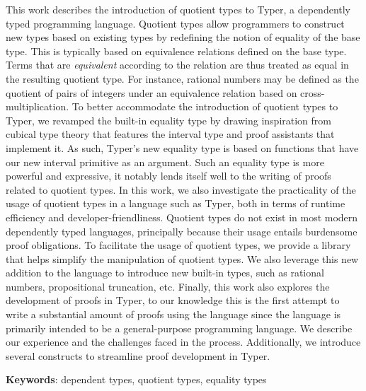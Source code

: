 \documentclass[12pt,twoside,maitrise]{dms}
\theoremstyle{definition}
\numberwithin{equation}{section}
\numberwithin{table}{chapter}
\numberwithin{figure}{chapter}
\begin{document}
This work describes the introduction of quotient types to
Typer\cite{monnier2019typer}, a dependently typed programming language. Quotient
types allow programmers to construct new types based on existing types by
redefining the notion of equality of the base type. This is typically based on
equivalence relations defined on the base type. Terms that are \emph{equivalent}
according to the relation are thus treated as equal in the resulting quotient
type. For instance, rational numbers may be defined as the quotient of pairs of
integers under an equivalence relation based on cross-multiplication. To better
accommodate the introduction of quotient types to Typer, we revamped the
built-in equality type by drawing inspiration from cubical type theory that
features the interval type and proof assistants that implement it. As such,
Typer's new equality type is based on functions that have our new interval
primitive as an argument. Such an equality type is more powerful and expressive,
it notably lends itself well to the writing of proofs related to quotient types.
In this work, we also investigate the practicality of the usage of quotient
types in a language such as Typer, both in terms of runtime efficiency and
developer-friendliness. Quotient types do not exist in most modern dependently
typed languages, principally because their usage entails burdensome proof
obligations. To facilitate the usage of quotient types, we provide a library
that helps simplify the manipulation of quotient types. We also leverage this
new addition to the language to introduce new built-in types, such as rational
numbers, propositional truncation, etc. Finally, this work also explores the
development of proofs in Typer, to our knowledge this is the first attempt to
write a substantial amount of proofs using the language since the language is
primarily intended to be a general-purpose programming language. We describe our
experience and the challenges faced in the process. Additionally, we introduce
several constructs to streamline proof development in Typer.

\textbf{Keywords}: dependent types, quotient types, equality types


\end{document}
